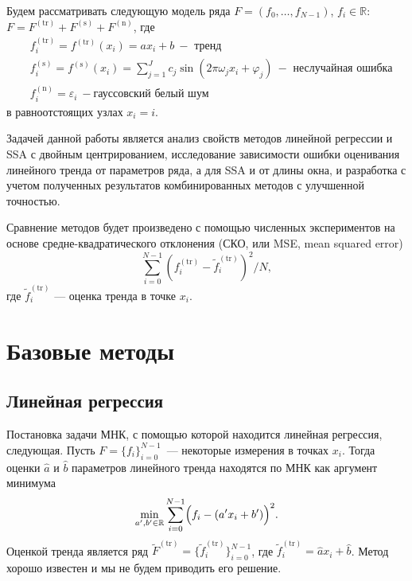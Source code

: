 \documentclass{spisok-article}
\begin{document}
Будем рассматривать следующую модель ряда $F=(f_0,\dots,f_{N-1})$, $f_i\in\mathbb{R}$:
$F=F^\mathrm{(tr)}+F^\mathrm{(s)}+F^\mathrm{(n)}$, где
\begin{align}
\nonumber
&f^\mathrm{(tr)}_i = f^\mathrm{(tr)}(x_i) = ax_i+b~-\text{ тренд}\\
\label{eq:model}
&f^\mathrm{(s)}_i = f^\mathrm{(s)}(x_i) = \sum_{j=1}^J c_j\sin(2\pi\omega_j x_i +\varphi_j)~-\text{ неслучайная ошибка}\\
\nonumber
&f_i^\mathrm{(n)} = \varepsilon_i~-\text{гауссовский белый шум}
\end{align}
в равноотстоящих узлах $x_i=i$.

Задачей данной работы является анализ свойств методов линейной регрессии и SSA с двойным центрированием,
исследование зависимости ошибки оценивания линейного тренда от параметров ряда, а для SSA и от длины окна,
и разработка с учетом полученных результатов комбинированных методов с улучшенной точностью.

Сравнение методов будет произведено с помощью численных экспериментов на основе средне-квадратического отклонения
(СКО, или MSE, mean squared error)
\begin{equation}
\label{eq:mse}
\sum_{i=0}^{N-1} \left(f_i^\mathrm{(tr)}-\tilde{f}_i^\mathrm{(tr)}\right)^2/N,
\end{equation}
где $\tilde{f}_i^\mathrm{(tr)}$ --- оценка тренда в точке $x_i$.

\section{Базовые методы}
\subsection{Линейная регрессия}
Постановка задачи МНК, с помощью которой находится линейная регрессия, следующая.
Пусть $F=\{f_i\}_{i=0}^{N-1}$~--- некоторые измерения в точках $x_i$.
Тогда оценки $\hat{a}$ и $\hat{b}$ параметров
линейного тренда находятся по МНК как аргумент минимума
\begin{equation*}
\min_{a',b'\in \mathbb{R}} \sum_{i=0}^{N-1}\Bigl(f_i-(a'x_i+b')\Bigl)^2.
\end{equation*}
Оценкой тренда является ряд $\widetilde{F}^\mathrm{(tr)}=\{\tilde{f}_i^\mathrm{(tr)}\}_{i=0}^{N-1}$,
где $\tilde{f}_i^\mathrm{(tr)} = \hat{a} x_i+\hat{b}$.
Метод хорошо известен и мы не будем приводить его решение.
\end{document}

